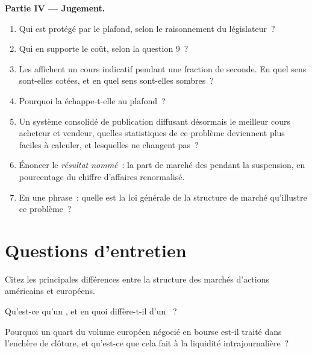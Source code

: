 \begin{problem}
\medskip\noindent\textbf{Partie IV --- Jugement.}
\begin{enumerate}[resume]
\item Qui est protégé par le plafond, selon le raisonnement du législateur~?
\item Qui en supporte le coût, selon la question 9~?
\item Les  affichent un cours indicatif pendant une fraction de
seconde. En quel sens sont-elles cotées, et en quel sens sont-elles sombres~?
\item Pourquoi la  échappe-t-elle au plafond~?
\item Un système consolidé de publication diffusant désormais le meilleur cours acheteur et vendeur, quelles
statistiques de ce problème deviennent plus faciles à calculer, et lesquelles
ne changent pas~?
\item Énoncer le \emph{résultat nommé}~: la part de marché des  pendant la suspension, en pourcentage du chiffre d'affaires renormalisé.
\item En une phrase~: quelle est la loi générale de la structure de marché
qu'illustre ce problème~?
\end{enumerate}
\end{problem}

\section{Questions d'entretien}

\begin{interviewq}\label{iq:m1:european-equity-market-structure:1}
Citez les principales différences entre la structure des marchés d'actions américains et européens.
\end{interviewq}

\begin{interviewq}\label{iq:m1:european-equity-market-structure:2}
Qu'est-ce qu'un , et en quoi diffère-t-il d'un
~?
\end{interviewq}

\begin{interviewq}\label{iq:m1:european-equity-market-structure:3}
Pourquoi un quart du volume européen négocié en bourse est-il traité dans
l'enchère de clôture, et qu'est-ce que cela fait à la liquidité intrajournalière~?
\end{interviewq}

